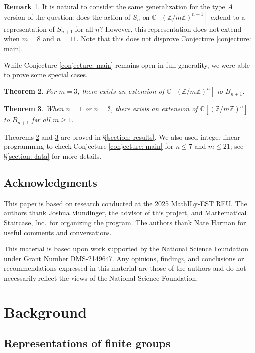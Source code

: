 \documentclass{amsart}
\theoremstyle{plain}
\newtheorem{theorem}{Theorem}[section]
\theoremstyle{definition}
\newtheorem{remark}[theorem]{Remark}
\newcommand{\C}{\mathbb{C}}
\newcommand{\Z}{\mathbb{Z}}
\begin{document}
\begin{remark}
    It is natural to consider the same generalization for the type $A$ version of the question: does the action of $S_n$ on $\C[ (\Z/m\Z)^{n-1}]$ extend to a representation of $S_{n+1}$ for all $n$? 
    However, this representation does not extend when $m=8$ and $n=11$.
    Note that this does not disprove Conjecture \ref{conjecture: main}.
\end{remark}


While Conjecture \ref{conjecture: main} remains open in full generality, we were able to prove some special cases.
\begin{theorem}\label{theorem: m=3}
    For $m=3$, there exists an extension of $\mathbb{C}[(\mathbb{Z}/m\mathbb{Z})^n]$ to $B_{n+1}$. 
\end{theorem}
\begin{theorem}\label{theorem: n le 2}
    When $n=1$ or $n=2$, there exists an extension of $\mathbb{C}[(\mathbb{Z}/m\mathbb{Z})^n]$ to $B_{n+1}$ for all $m\ge 1.$  
\end{theorem}
Theorems \ref{theorem: m=3} and \ref{theorem: n le 2} are proved in §\ref{section: results}. 
We also used integer linear programming to check Conjecture \ref{conjecture: main} for $n\le 7$ and $ m\le 21$; see §\ref{section: data} for more details.

\subsection*{Acknowledgments}

This paper is based on research conducted at the 2025 MathILy-EST REU. 
The authors thank Joshua Mundinger, the advisor of this project, and Mathematical Staircase, Inc.\ for organizing the program. 
The authors thank Nate Harman for useful comments and conversations.


This material is based upon work supported by the National Science Foundation under Grant Number DMS-2149647. Any opinions, findings, and conclusions or recommendations expressed in this material are those of the authors and do not necessarily reflect the views of the National Science Foundation.

\section{Background}

\subsection{Representations of finite groups}
\end{document}
